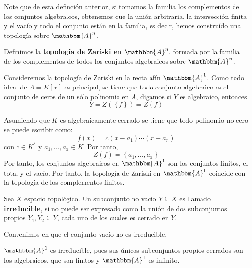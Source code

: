 \documentclass[12pt]{report}
\newcounter{it}
\theoremstyle{largebreak}
\newcommand{\bbm}[1]{\ensuremath{\mathbbm{#1}}}
\begin{document}
    Note que de esta definción anterior, si tomamos la familia los complementos de los conjuntos algebraicos, obtenemos que la unión arbitraria, la intersección finita y el vacío y todo el conjunto están en la familia, es decir, hemos construído una topología sobre $\bbm{A}^n$.

    \begin{mydef}
        Definimos la \textbf{topología de Zariski en $\bbm{A}^n$}, formada por la familia de los complementos de todos los conjuntos algebraicos sobre $\bbm{A}^n$.
    \end{mydef}

    \begin{exa}
        Consideremos la topología de Zariski en la recta afín $\bbm{A}^1$. Como todo ideal de $A=K[x]$ es principal, se tiene que todo conjunto algebraico es el conjunto de ceros de un sólo polinomio en $A$, digamos si $Y$ es algebraico, entonces
        \begin{equation*}
            Y=Z(\left\{f\right\})=Z(f)
        \end{equation*}

        Asumiendo que $K$ es algebraicamente cerrado se tiene que todo polinomio no cero se puede escribir como:
        \begin{equation*}
            f(x)=c(x-a_1)\cdots(x-a_n)
        \end{equation*}
        con $c\in K^*$ y $a_1,...,a_n\in K$. Por tanto,
        \begin{equation*}
            Z(f)=\left\{a_1,...,a_n\right\}
        \end{equation*}
        Por tanto, los conjuntos algebraicos en $\bbm{A}^1$ son los conjuntos finitos, el total y el vacío. Por tanto, la topología de Zariski en $\bbm{A}^1$ coincide con la topología de los complementos finitos.
    \end{exa}

    \begin{mydef}
        Sea $X$ espacio topológico. Un subconjunto no vacío $Y\subseteq X$ es llamado \textbf{irreducible}, si no puede ser expresado como la unión de dos subconjuntos propios $Y_1,Y_2\subseteq Y$, cada uno de los cuales es cerrado en $Y$.

        Convenimos en que el conjunto vacío no es irreducible.
    \end{mydef}

    \begin{exa}
        $\bbm{A}^1$ es irreducible, pues sus únicos subconjuntos propios cerrados son los algebraicos, que son finitos y $\bbm{A}^1$ es infinito.
    \end{exa}
\end{document}
